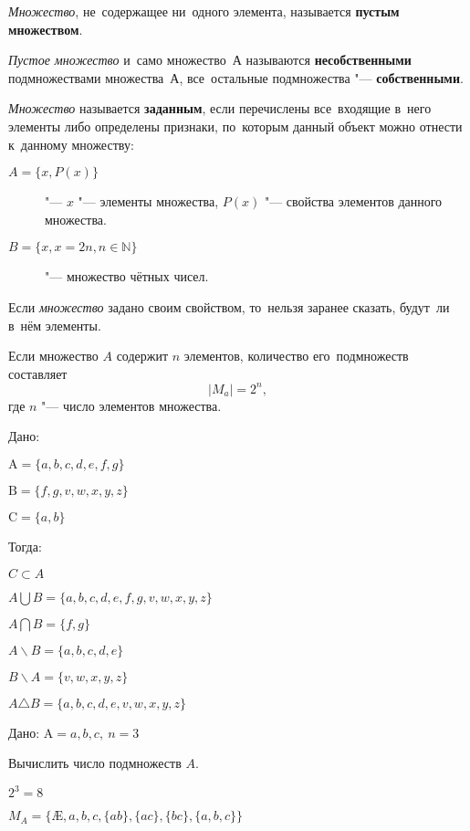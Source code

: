 \documentclass[]{scrartcl}
\begin{document}
{{\emph{Множество}, не~содержащее ни~одного элемента, называется \textbf{пустым множеством}.

\emph{Пустое множество} и~само множество~$А$ называются \textbf{несобственными} подмножествами множества~$А$, все~остальные подмножества "--- \textbf{собственными}.

\emph{Множество} называется \textbf{заданным}, если перечислены все~входящие в~него элементы либо определены признаки, по~которым данный объект можно отнести к~данному множеству:
\begin{description}
	\item[$A=\{x, P(x)\}$] "--- $x$ "--- элементы множества, $P(x)$ "--- свойства элементов данного множества.
	\item[$B=\{x, x=2n, n \in \mathbb{N}\}$] "--- множество чётных чисел.
\end{description}

Если \emph{множество} задано своим свойством, то~нельзя заранее сказать, будут~ли в~нём элементы.

Если множество $A$ содержит $n$ элементов, количество его~подмножеств составляет
\begin{equation}\label{n-submultitudes}
|M_{a}| = 2^n,
\end{equation}
где $n$ "--- число элементов множества.

\begin{Thexmpl}
	Дано:
	
	$\text{A}={\{a, b, c, d, e, f ,g\}}$
	
	$\text{B}={\{f, g, v, w, x, y, z\}}$
	
	$\text{C}={\{a, b\}}$
	
	Тогда:
	
	$C \subset A$
	
	$A \bigcup B = {\{a, b, c, d, e, f, g, v, w, x, y, z\}}$
	
	$A \bigcap B = {\{f, g\}}$
	
	$A \backslash B = {\{a, b, c, d, e\}}$
	
	$B \backslash A = {\{v, w, x, y, z\}}$
	
	$A \triangle B = {\{a, b, c, d, e, v, w, x, y, z\}}$
\end{Thexmpl}


\begin{Thexmpl}
	Дано: $\text{A}={{a, b, c}},\ n = 3$
	
	Вычислить число подмножеств $A$.
	
	$2^3 = 8$
	
	$M_A = \{\text{\AE{}}, a, b, c, \{ab\}, \{ac\}, \{bc\}, \{a,b,c\}\}$
	

\end{Thexmpl}}}
\end{document}
